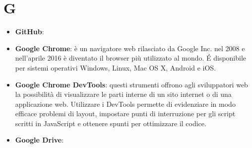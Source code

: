 \section{G}
\begin{itemize}
	\item
	\textbf{GitHub}: 
	\item
	\textbf{Google Chrome}: è un navigatore web rilasciato da Google Inc. nel 2008 e nell'aprile 2016 è diventato il browser più utilizzato al mondo. \'E disponibile per sistemi operativi Windows, Linux, Mac OS X, Android e iOS. 
	\item
	\textbf{Google Chrome DevTools}: questi strumenti offrono agli sviluppatori web la possibilità di visualizzare le parti interne di un sito internet o di una applicazione web. Utilizzare i DevTools permette di evidenziare in modo efficace problemi di layout, impostare punti di interruzione per gli script scritti in JavaScript e ottenere spunti per ottimizzare il codice.
	\item
	\textbf{Google Drive}: 
\end{itemize}
